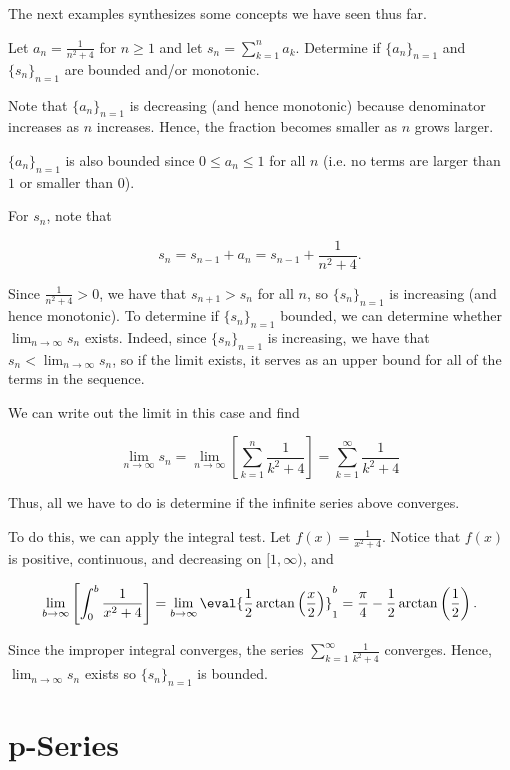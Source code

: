 \documentclass{ximera}
\begin{document}
The next examples synthesizes some concepts we have seen thus far.
\begin{example}
Let $a_n = \frac{1}{n^2+4}$ for $n \geq 1$ and let $s_n = \sum_{k=1}^n a_k$.  Determine if $\{a_n\}_{n=1}$ and $\{s_n\}_{n=1}$ are bounded and/or monotonic.

\begin{explanation}
Note that $\{a_n\}_{n=1}$ is decreasing (and hence monotonic) because denominator increases as $n$ increases.  Hence, the fraction becomes smaller as $n$ grows larger.  

$\{a_n\}_{n=1}$ is also bounded since $0 \leq a_n \leq 1$ for all $n$ (i.e. no terms are larger than $1$ or smaller than $0$).

For $s_n$, note that 

\[
s_n = s_{n-1} +a_n = s_{n-1} + \frac{1}{n^2+4}. 
\]

Since $ \frac{1}{n^2+4} >0$, we have that $s_{n+1} > s_n$ for all $n$, so $\{s_n\}_{n=1}$ is increasing (and hence monotonic).  To determine if $\{s_n\}_{n=1}$ bounded, we can determine whether $\lim_{n \to \infty} s_n$ exists.  Indeed, since $\{s_n\}_{n=1}$ is increasing, we have that $s_n < \lim_{n \to \infty} s_n$, so if the limit exists, it serves as an upper bound for all of the terms in the sequence.

We can write out the limit in this case and find

\[
\lim_{n \to \infty} s_n = \lim_{n \to \infty} \left[ \sum_{k=1}^n \frac{1}{k^2+4} \right] =  \sum_{k=1}^{\infty} \frac{1}{k^2+4}
\]
\end{explanation}

Thus, all we have to do is determine if the infinite series above converges.  

To do this, we can apply the integral test.  Let $f(x)= \frac{1}{x^2+4}$.  Notice that $f(x)$ is positive, continuous, and decreasing on $[1,\infty)$, and 

\[
\lim_{b \to \infty} \left[ \int_0^b \frac{1}{x^2+4} \right]= \lim_{b \to \infty} \eval{\frac{1}{2} \arctan\left(\frac{x}{2}\right)}_1^b =\frac{\pi}{4}- \frac{1}{2}\arctan\left(\frac{1}{2}\right).
\]

Since the improper integral converges, the series $\sum_{k=1}^{\infty} \frac{1}{k^2+4}$ converges.  Hence, $\lim_{n \to \infty}s_n$ exists so $\{s_n\}_{n=1}$ is bounded.


\end{example}
\section{p-Series}
\end{document}
